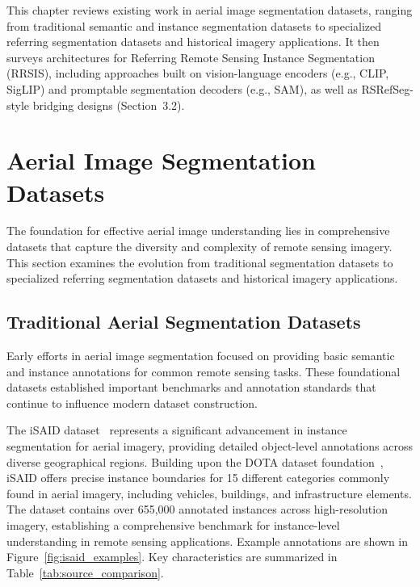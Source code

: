 \cleardoublepage
\label{chap:architecture}

This chapter reviews existing work in aerial image segmentation datasets, ranging from traditional semantic and instance segmentation datasets to specialized referring segmentation datasets and historical imagery applications. It then surveys architectures for Referring Remote Sensing Instance Segmentation (RRSIS), including approaches built on vision-language encoders (e.g., CLIP, SigLIP) and promptable segmentation decoders (e.g., SAM), as well as RSRefSeg-style bridging designs (Section~3.2).

\section{Aerial Image Segmentation Datasets}

The foundation for effective aerial image understanding lies in comprehensive datasets that capture the diversity and complexity of remote sensing imagery. This section examines the evolution from traditional segmentation datasets to specialized referring segmentation datasets and historical imagery applications.

\subsection{Traditional Aerial Segmentation Datasets}

Early efforts in aerial image segmentation focused on providing basic semantic and instance annotations for common remote sensing tasks. These foundational datasets established important benchmarks and annotation standards that continue to influence modern dataset construction.

The iSAID dataset~\cite{zamir2019isaid} represents a significant advancement in instance segmentation for aerial imagery, providing detailed object-level annotations across diverse geographical regions. Building upon the DOTA dataset foundation~\cite{xia2018dota}, iSAID offers precise instance boundaries for 15 different categories commonly found in aerial imagery, including vehicles, buildings, and infrastructure elements. The dataset contains over 655,000 annotated instances across high-resolution imagery, establishing a comprehensive benchmark for instance-level understanding in remote sensing applications. Example annotations are shown in Figure~\ref{fig:isaid_examples}. Key characteristics are summarized in Table~\ref{tab:source_comparison}.


